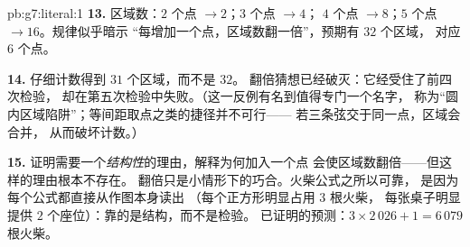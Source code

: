 \begin{solution}{pb:g7:literal:1}
\textbf{13.} 区域数：$2$ 个点 $\to 2$；$3$ 个点 $\to 4$；
$4$ 个点 $\to 8$；$5$ 个点 $\to 16$。规律似乎暗示
“每增加一个点，区域数翻一倍”，预期有 $32$ 个区域，
对应 $6$ 个点。

\textbf{14.} 仔细计数得到 $31$ 个区域，而不是 $32$。
翻倍猜想已经破灭：它经受住了前四次检验，
却在第五次检验中失败。（这一反例有名到值得专门一个名字，
称为“圆内区域陷阱”；等间距取点之类的捷径并不可行——
若三条弦交于同一点，区域会合并，
从而破坏计数。）

\textbf{15.} 证明需要一个\emph{结构性}的理由，解释为何加入一个点
会使区域数翻倍——但这样的理由根本不存在。
翻倍只是小情形下的巧合。火柴公式之所以可靠，
是因为每个公式都直接从作图本身读出
（每个正方形明显占用 $3$ 根火柴，
每张桌子明显提供 $2$ 个座位）：靠的是结构，而不是检验。
已证明的预测：$3 \times 2\,026 + 1 = 6\,079$ 根火柴。
\end{solution}
